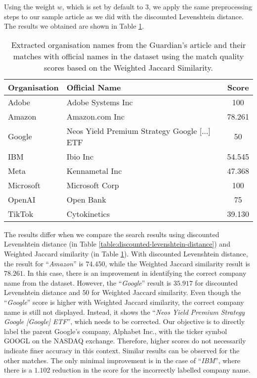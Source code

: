 Using the weight $w$, which is set by default to $3$, we apply the same preprocessing steps to our sample article as we did with the discounted Levenshtein distance. The results we obtained are shown in Table \ref{table:weighted-jaccard-similarity}.

\begin{table}[ht]
    \centering
    \caption{Extracted organisation names from the Guardian's article and their matches with official names in the dataset using the match quality scores based on the Weighted Jaccard Similarity.}
    \label{table:weighted-jaccard-similarity}
    \begin{tabular}{l l c}
        \hline
        Organisation & Official Name & Score \\
        \hline
        Adobe & Adobe Systems Inc & 100 \\
        Amazon & Amazon.com Inc & 78.261 \\
        Google & Neos Yield Premium Strategy Google [...] ETF & 50 \\
        IBM & Ibio Inc & 54.545 \\
        Meta & Kennametal Inc & 47.368 \\
        Microsoft & Microsoft Corp & 100 \\
        OpenAI & Open Bank & 75 \\
        TikTok & Cytokinetics & 39.130 \\
        \hline
    \end{tabular}
\end{table}

The results differ when we compare the search results using discounted Levenshtein distance (in Table \ref{table:discounted-levenshtein-distance}) and Weighted Jaccard similarity (in Table \ref{table:weighted-jaccard-similarity}). With discounted Levenshtein distance, the result for ``\textit{Amazon}'' is $74.450$, while the Weighted Jaccard similarity result is $78.261$. In this case, there is an improvement in identifying the correct company name from the dataset. However, the ``\textit{Google}'' result is $35.917$ for discounted Levenshtein distance and $50$ for Weighted Jaccard similarity. Even though the ``\textit{Google}'' score is higher with Weighted Jaccard similarity, the correct company name is still not displayed. Instead, it shows the ``\textit{Neos Yield Premium Strategy Google [Google] ETF}'', which needs to be corrected. Our objective is to directly label the parent Google's company, Alphabet Inc., with the ticker symbol GOOGL on the NASDAQ exchange. Therefore, higher scores do not necessarily indicate finer accuracy in this context. Similar results can be observed for the other matches. The only minimal improvement is in the case of ``\textit{IBM}'', where there is a $1.102$ reduction in the score for the incorrectly labelled company name.

